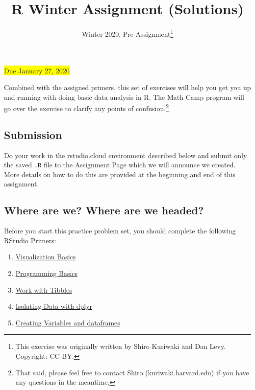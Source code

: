 \documentclass[11pt]{article}
\title{ \LARGE\textbf{R Winter Assignment (Solutions)}}
\author{}
\date{Winter 2020, Pre-Assignment\footnote{This exercise was originally
  written by Shiro Kuriwaki and Dan Levy. Copyright: CC-BY.}}
\providecommand{\tightlist}{%
  \setlength{\itemsep}{0pt}\setlength{\parskip}{0pt}}
\newcommand{\highlight}[1]{\colorbox{yellow}{#1}}
\begin{document}
\maketitle

\begin{center}
\highlight{Due January 27, 2020}
\end{center}

\noindent Combined with the assigned primers, this set of exercises will
help you get you up and running with doing basic data analysis in R. The
Math Camp program will go over the exercise to clarify any points of
confusion.\footnote{That said, please feel free to contact Shiro (kuriwaki\@g.harvard.edu) if you have any questions in the meantime. }

\hypertarget{submission}{%
\subsection*{Submission}\label{submission}}

Do your work in the rstudio.cloud environment described below and submit
only the saved \texttt{.R} file to the Assignment Page which we will
announce we created. More details on how to do this are provided at the
beginning and end of this assignment.

\hypertarget{where-are-we-where-are-we-headed}{%
\subsection*{Where are we? Where are we
headed?}\label{where-are-we-where-are-we-headed}}

Before you start this practice problem set, you should complete the
following RStudio Primers:

\begin{enumerate}
\def\labelenumi{\arabic{enumi}.}
\tightlist
\item
  \href{https://rstudio.cloud/learn/primers/1.1}{Visualization Basics}
\item
  \href{https://rstudio.cloud/learn/primers/1.2}{Programming Basics}
\item
  \href{https://rstudio.cloud/learn/primers/2.1}{Work with Tibbles}
\item
  \href{https://rstudio.cloud/learn/primers/2.2}{Isolating Data with
  dplyr}
\item
  \href{https://math-camp-2019.shinyapps.io/03a-deriving-mutate/}{Creating
  Variables and dataframes}
\end{enumerate}
\end{document}
